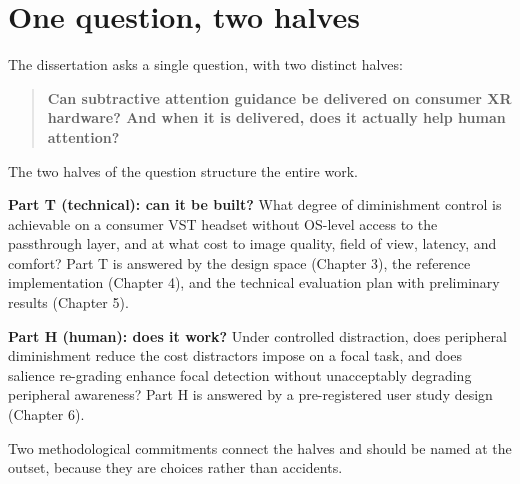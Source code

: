 \section{One question, two halves}

The dissertation asks a single question, with two distinct halves:

\begin{quote}
\textbf{Can subtractive attention guidance be delivered on consumer XR hardware? And when it is
delivered, does it actually help human attention?}
\end{quote}

The two halves of the question structure the entire work.

\textbf{Part T (technical): can it be built?} What degree of diminishment control is achievable on a
consumer VST headset without OS-level access to the passthrough layer, and at what cost to image
quality, field of view, latency, and comfort? Part T is answered by the design space (Chapter 3), the
reference implementation (Chapter 4), and the technical evaluation plan with preliminary results
(Chapter 5).

\textbf{Part H (human): does it work?} Under controlled distraction, does peripheral diminishment reduce
the cost distractors impose on a focal task, and does salience re-grading enhance focal detection
without unacceptably degrading peripheral awareness? Part H is answered by a pre-registered user
study design (Chapter 6).

Two methodological commitments connect the halves and should be named at the outset, because they are
choices rather than accidents.

